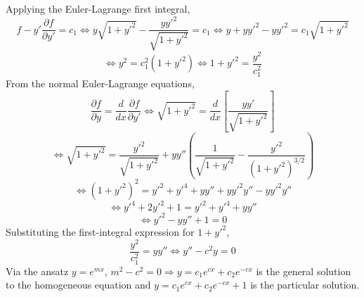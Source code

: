 \documentclass{article}
\begin{document}
\section{}
Applying the Euler-Lagrange first integral,
\[f-y'\frac{\partial f}{\partial y'}=c_1\Leftrightarrow y\sqrt{1+y'^2}-\frac{yy'^2}{\sqrt{1+y'^2}}=c_1\Leftrightarrow y+yy'^2-yy'^2=c_1\sqrt{1+y'^2}\]
\[\Leftrightarrow y^2=c_1^2(1+y'^2)\Leftrightarrow 1+y'^2= \frac{y^2}{c_1^2}\]
From the normal Euler-Lagrange equations,
\[\frac{\partial f}{\partial y}=\frac{d}{dx}\frac{\partial f}{\partial y'}\Leftrightarrow \sqrt{1+y'^2}=\frac{d}{dx}\left[ \frac{yy'}{\sqrt{1+y'^2}} \right]\]
\[\Leftrightarrow \sqrt{1+y'^2}=\frac{y'^2}{\sqrt{1+y'^2}}+yy''\left(\frac{1}{\sqrt{1+y'^2}}- \frac{y'^2}{(1+y'^2)^{3/2}} \right)\]
\[\Leftrightarrow (1+y'^2)^2=y'^2+y'^4+yy''+yy'^2y''-yy'^2y''\]
\[\Leftrightarrow y'^4+2y'^2+1=y'^2+y'^4+yy''\]\[\Leftrightarrow y'^2-yy''+1=0\]
Substituting the first-integral expression for $1+y'^2$,
\[\frac{y^2}{c_1^2}=yy''\Leftrightarrow y''-c^2y=0\]
Via the ansatz $y=e^{mx}$, $m^2-c^2=0\Rightarrow y=c_1e^{cx}+c_2e^{-cx}$ is the general solution to the homogeneous equation and $y=c_1e^{cx}+c_2e^{-cx}+1$ is the particular solution.
\end{document}
